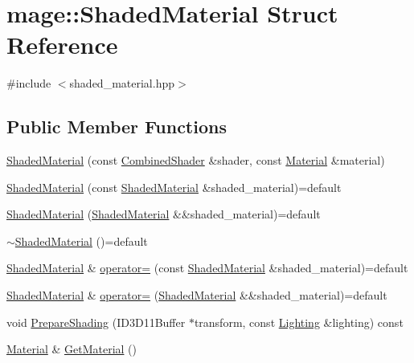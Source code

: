 \hypertarget{structmage_1_1_shaded_material}{}\section{mage\+:\+:Shaded\+Material Struct Reference}
\label{structmage_1_1_shaded_material}


{\ttfamily \#include $<$shaded\+\_\+material.\+hpp$>$}

\subsection*{Public Member Functions}
\begin{DoxyCompactItemize}
\item 
\hyperlink{structmage_1_1_shaded_material_a58594c0008865c68efc6ff6868016236}{Shaded\+Material} (const \hyperlink{structmage_1_1_combined_shader}{Combined\+Shader} \&shader, const \hyperlink{structmage_1_1_material}{Material} \&material)
\item 
\hyperlink{structmage_1_1_shaded_material_a8bd45b489933e89f0a16f79e29161c27}{Shaded\+Material} (const \hyperlink{structmage_1_1_shaded_material}{Shaded\+Material} \&shaded\+\_\+material)=default
\item 
\hyperlink{structmage_1_1_shaded_material_acd222233b31513b095e26aa6e38c4a99}{Shaded\+Material} (\hyperlink{structmage_1_1_shaded_material}{Shaded\+Material} \&\&shaded\+\_\+material)=default
\item 
\hyperlink{structmage_1_1_shaded_material_ac7be54322faed90a07b26225e270e571}{$\sim$\+Shaded\+Material} ()=default
\item 
\hyperlink{structmage_1_1_shaded_material}{Shaded\+Material} \& \hyperlink{structmage_1_1_shaded_material_ade9ec3ee6aae198e695240a5b89a0d72}{operator=} (const \hyperlink{structmage_1_1_shaded_material}{Shaded\+Material} \&shaded\+\_\+material)=default
\item 
\hyperlink{structmage_1_1_shaded_material}{Shaded\+Material} \& \hyperlink{structmage_1_1_shaded_material_a29fb482ab140fcb47709ffda03a67714}{operator=} (\hyperlink{structmage_1_1_shaded_material}{Shaded\+Material} \&\&shaded\+\_\+material)=default
\item 
void \hyperlink{structmage_1_1_shaded_material_a53336b2d98e414a73ad64f3176b5e996}{Prepare\+Shading} (I\+D3\+D11\+Buffer $\ast$transform, const \hyperlink{structmage_1_1_lighting}{Lighting} \&lighting) const
\item 
\hyperlink{structmage_1_1_material}{Material} \& \hyperlink{structmage_1_1_shaded_material_a785d01e0156c6aba84d479917b62ab03}{Get\+Material} ()

\end{DoxyCompactItemize}
